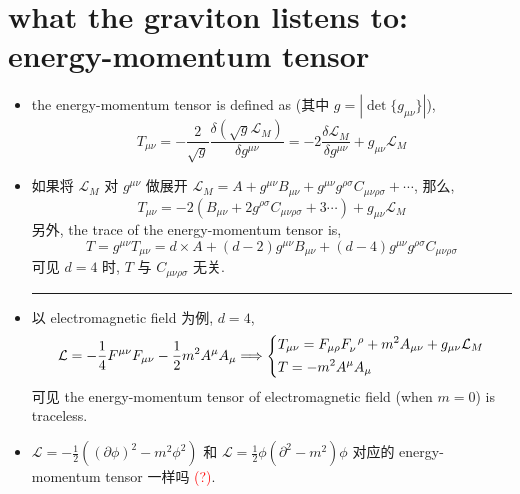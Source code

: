 \section{what the graviton listens to: energy-momentum tensor}
\begin{itemize}
	\item the energy-momentum tensor is defined as (其中 $g = |\det \{g_{\mu \nu}\}|$),
	\begin{equation}
		T_{\mu \nu} = - \frac{2}{\sqrt{g}} \frac{\delta (\sqrt{g} \mathcal{L}_M)}{\delta g^{\mu \nu}} = - 2 \frac{\delta \mathcal{L}_M}{\delta g^{\mu \nu}} + g_{\mu \nu} \mathcal{L}_M
	\end{equation}
	
	\item 如果将 $\mathcal{L}_M$ 对 $g^{\mu \nu}$ 做展开 $\mathcal{L}_M = A + g^{\mu \nu} B_{\mu \nu} + g^{\mu \nu} g^{\rho \sigma} C_{\mu \nu \rho \sigma} + \cdots$, 那么,
	\begin{equation}
		T_{\mu \nu} = - 2 (B_{\mu \nu} + 2 g^{\rho \sigma} C_{\mu \nu \rho \sigma} + 3 \cdots) + g_{\mu \nu} \mathcal{L}_M
	\end{equation}
	另外, the trace of the energy-momentum tensor is,
	\begin{equation}
		T = g^{\mu \nu} T_{\mu \nu} = d \times A + (d - 2) g^{\mu \nu} B_{\mu \nu} + (d - 4) g^{\mu \nu} g^{\rho \sigma} C_{\mu \nu \rho \sigma}
	\end{equation}
	可见 $d = 4$ 时, $T$ 与 $C_{\mu \nu \rho \sigma}$ 无关.
	
	\noindent\rule[0.5ex]{\linewidth}{0.5pt} %
	
	\item 以 electromagnetic field 为例, $d = 4$,
	\begin{equation}
		\mathcal{L} = - \frac{1}{4} F^{\mu \nu} F_{\mu \nu} - \frac{1}{2} m^2 A^\mu A_\mu \Longrightarrow \begin{dcases}
			T_{\mu \nu} = F_{\mu \rho} \tensor{F}{_\nu^\rho} + m^2 A_{\mu \nu} + g_{\mu \nu} \mathcal{L}_M \\
			T = - m^2 A^\mu A_\mu
		\end{dcases}
	\end{equation}
	可见 the energy-momentum tensor of electromagnetic field (when $m = 0$) is traceless.
	
	\item $\mathcal{L} = - \frac{1}{2} ((\partial \phi)^2 - m^2 \phi^2)$ 和 $\mathcal{L} = \frac{1}{2} \phi (\partial^2 - m^2) \phi$ 对应的 energy-momentum tensor 一样吗 \textcolor{red}{(?)}.
\end{itemize}
